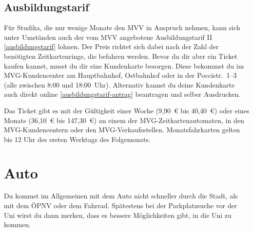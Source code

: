 \begin{urlList}
\end{urlList}

\subsection*{Ausbildungstarif}
Für Studika, die nur wenige Monate den MVV in Anspruch nehmen, kann sich unter
Umständen auch der vom MVV angebotene Ausbildungstarif II
\ref{ausbildungstarif} lohnen. Der Preis richtet sich dabei nach der Zahl der
benötigten Zeitkartenringe, die befahren werden. Bevor du dir aber ein Ticket
kaufen kannst, musst du dir eine Kundenkarte besorgen. Diese bekommst du im
MVG-Kundencenter am Hauptbahnhof, Ostbahnhof oder in der \mbox{Poccistr.}~1--3 (alle
zwischen 8:00 und 18:00~Uhr). Alternativ kannst du deine Kundenkarte auch
direkt online \ref{ausbildungstarif-antrag} beantragen und selber Ausdrucken.

Das Ticket gibt es mit der Gültigkeit einer Woche (9,90~€ bis 40,40~€) oder eines Monats (36,10~€ bis 147,30~€) an einem der MVG-Zeitkartenautomaten, in den MVG-Kundencentern oder den MVG-Verkaufsstellen. Monatsfahrkarten gelten bis 12 Uhr des ersten Werktags des Folgemonats.

\begin{urlList}
\end{urlList}

\section{Auto}
Du kommst im Allgemeinen mit dem Auto nicht schneller durch die Stadt, als mit dem ÖPNV oder dem Fahrrad. Spätestens bei der Parkplatzsuche vor der Uni wirst du dann merken, dass es bessere Möglichkeiten gibt, in die Uni zu kommen.
